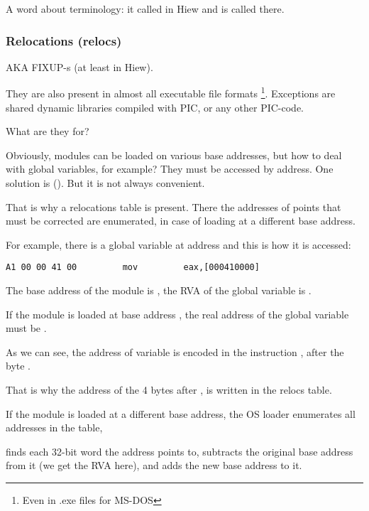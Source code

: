 A word about terminology:  it called  in Hiew
and  is called  there.

\subsubsection{Relocations (relocs)}
\label{subsec:relocs}

\ac{AKA} FIXUP-s (at least in Hiew).

They are also present in almost all executable file formats
\footnote{Even in .exe files for MS-DOS}.
Exceptions are shared dynamic libraries compiled with \ac{PIC}, or any other \ac{PIC}-code.

What are they for?

Obviously, modules can be loaded on various base addresses, but how to deal with global variables, for example?
They must be accessed by address.  One solution is \PICcode{} ().
But it is not always convenient.

That is why a relocations table is present.
There the addresses of points that must be corrected are enumerated, 
in case of loading at a different base address.

For example, there is a global variable at address  and this is how it is accessed:

\begin{lstlisting}
A1 00 00 41 00         mov         eax,[000410000]
\end{lstlisting}

The base address of the module is , the \ac{RVA} of the global variable is .

If the module is loaded at base address , the real address of the global variable must be .


As we can see, the address of variable is encoded in the instruction , after the byte .

That is why the address of the 4 bytes after , is written in the relocs table.

If the module is loaded at a different base address, the \ac{OS} loader enumerates all addresses in the table, 

finds each 32-bit word the address points to, subtracts the original base address from it
(we get the \ac{RVA} here), and adds the new base address to it.

